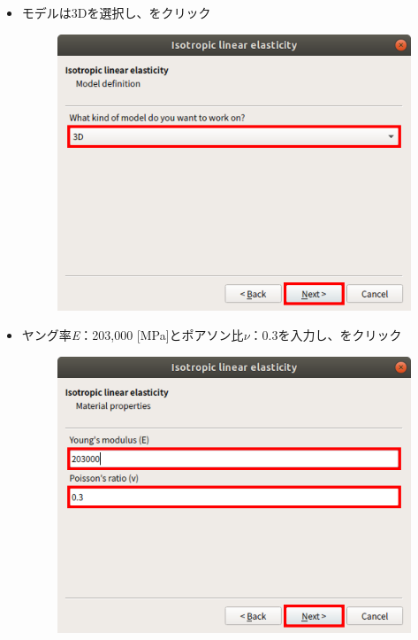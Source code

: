 \begin{itemize}
\begin{figure}[H]
	      \end{figure}
	      \clearpage
	\item モデルは3Dを選択し、をクリック
	      \begin{figure}[H]
		      \centering
		      \includegraphics{fig/meca003.png}
	      \end{figure}
	      \clearpage
	\item ヤング率\textit{E}：203,000 [MPa]とポアソン比$\nu$：0.3を入力し、をクリック
	      \begin{figure}[H]
		      \centering
		      \includegraphics{fig/meca004.png}

\end{figure}
\end{itemize}
